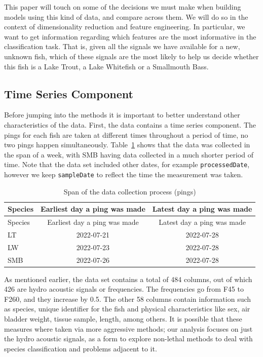 \documentclass[
  letterpaper,
  DIV=11,
  numbers=noendperiod]{scrartcl}
\begin{document}
This paper will touch on some of the decisions we must make when
building models using this kind of data, and compare across them. We
will do so in the context of dimensionality reduction and feature
engineering. In particular, we want to get information regarding which
features are the most informative in the classification task. That is,
given all the signals we have available for a new, unknown fish, which
of these signals are the most likely to help us decide whether this fish
is a Lake Trout, a Lake Whitefish or a Smallmouth Bass.

\hypertarget{time-series-component}{%
\subsection{Time Series Component}\label{time-series-component}}

Before jumping into the methods it is important to better understand
other characteristics of the data. First, the data contains a time
series component. The pings for each fish are taken at different times
throughout a period of time, no two pings happen simultaneously.
Table~\ref{tbl-data-time} shows that the data was collected in the span
of a week, with SMB having data collected in a much shorter period of
time. Note that the data set included other dates, for example
\texttt{processedDate}, however we keep \texttt{sampleDate} to reflect
the time the measurement was taken.

\hypertarget{tbl-data-time}{}
\begin{longtable}[]{@{}lcc@{}}
\caption{\label{tbl-data-time}Span of the data collection process
(pings)}\tabularnewline
\toprule\noalign{}
Species & Earliest day a ping was made & Latest day a ping was made \\
\midrule\noalign{}
\endfirsthead
\toprule\noalign{}
Species & Earliest day a ping was made & Latest day a ping was made \\
\midrule\noalign{}
\endhead
\bottomrule\noalign{}
\endlastfoot
LT & 2022-07-21 & 2022-07-28 \\
LW & 2022-07-23 & 2022-07-28 \\
SMB & 2022-07-26 & 2022-07-28 \\
\end{longtable}

As mentioned earlier, the data set contains a total of 484 columns, out
of which 426 are hydro acoustic signals or frequencies. The frequencies
go from F45 to F260, and they increase by 0.5. The other 58 columns
contain information such as species, unique identifier for the fish and
physical characteristics like sex, air bladder weight, tissue sample,
length, among others. It is possible that these measures where taken via
more aggressive methods; our analysis focuses on just the hydro acoustic
signals, as a form to explore non-lethal methods to deal with species
classification and problems adjacent to it.
\end{document}
